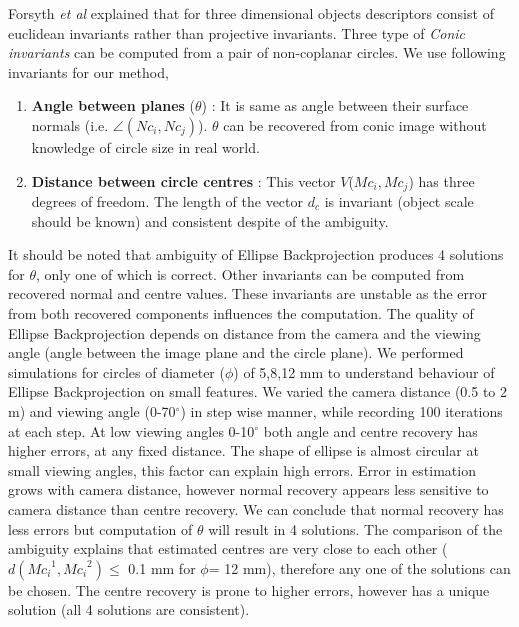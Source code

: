 \documentclass{bmvc2k}
\def\etal{\emph{et al}\bmvaOneDot}
\begin{document}
Forsyth \etal \cite{forsyth_91} explained that for three dimensional objects descriptors consist of euclidean invariants rather than projective invariants. Three type of \textit{Conic invariants} can be computed from a pair of non-coplanar circles.
We use following invariants for our method, 
\begin{enumerate}
	\item \textbf{Angle between planes} ($\theta$) : It is same as angle between their surface normals 
	(i.e. $ \angle(Nc_i,Nc_j) $). $\theta$ can be recovered from conic image without knowledge of circle size in real world.  
	\item \textbf{Distance between circle centres} : This vector $ V $($ Mc_i,Mc_j $) has three degrees of freedom. The length of the vector $d_c$ is invariant (object scale should be known) and consistent despite of the ambiguity. 
\end{enumerate}
It should be noted that ambiguity of Ellipse Backprojection produces 4 solutions for $\theta$, only one of which is correct. 
Other invariants can be computed from recovered normal and centre values. These invariants are unstable \cite{forsyth_91} as the error from both recovered components influences the computation.
The quality of Ellipse Backprojection depends on distance from the camera and the viewing angle (angle between the image plane and the circle plane)\cite{werghi_pose_1996}. 
We performed simulations for circles of diameter ($\phi$) of 5,8,12 mm to understand behaviour of Ellipse Backprojection on small features. We varied the camera distance (0.5 to 2 m) and viewing angle (0-70$^\circ$) in step wise manner, while recording 100 iterations at each step.
At low viewing angles 0-10$^\circ$ both angle and centre recovery has higher errors, at any fixed distance. 
The shape of ellipse is almost circular at small viewing angles, this factor can explain high errors. 
Error in estimation grows with camera distance, however normal recovery appears less sensitive to camera distance than centre recovery. We can conclude that normal recovery has less errors but computation of $\theta$ will result in 4 solutions. The comparison of the ambiguity explains that estimated centres are very close to each other ($ d({Mc_i}^1,{Mc_i}^2) \leq$ 0.1 mm for $\phi$= 12 mm), therefore any one of the solutions can be chosen. The centre recovery is prone to higher errors, however has a unique solution (all 4 solutions are consistent).
\end{document}

